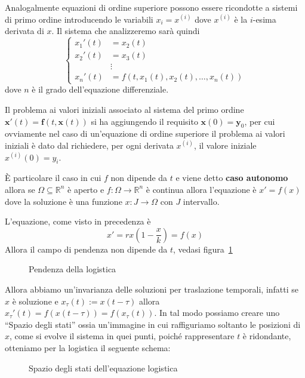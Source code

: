 Analogalmente equazioni di ordine superiore possono essere ricondotte a sistemi
di primo ordine introducendo le variabili \(x_{i} = x^{(i)}\) dove \(x^{(i)}\) è
la \(i\)-esima derivata di \(x\). Il sistema che analizzeremo sarà quindi
\[
    \begin{cases}
        x_{1}'(t) &= x_{2}(t) \\
        x_{2}'(t) &= x_{3}(t) \\
        &\vdots \\
        x_{n}'(t) &= f(t, x_{1}(t), x_{2}(t), \ldots, x_{n}(t))
    \end{cases}
\]
dove \(n\) è il grado dell'equazione differenziale.

Il problema ai valori iniziali associato al sistema del primo ordine
\(\mathbf{x}'(t) = \mathbf{f}(t, \mathbf{x}(t))\) si ha aggiungendo il requisito
\(\mathbf{x}(0) = \mathbf{y}_0\), per cui ovviamente nel caso di un'equazione di
ordine superiore il problema ai valori iniziali è dato dal richiedere, per ogni
derivata \(x^{(i)}\), il valore iniziale \(x^{(i)}(0) = y_{i}\).

È particolare il caso in cui \(f\) non dipende da \(t\) e viene detto
\textbf{caso autonomo} allora se \(\Omega \subseteq \mathbb{R}^{n} \) è aperto e
\(f: \Omega \to \mathbb{R}^{n}\) è continua allora l'equazione è \(x' = f(x)\)
dove la soluzione è una funzione \(x : J \to \Omega\) con \(J\) intervallo.
\begin{example}[Logistica]
    L'equazione, come visto in precedenza è 
    \[
        x' = rx(1- \frac{x}{k}) = f(x)
    \]
    Allora il campo di pendenza non dipende da \(t\), vedasi
    figura~\ref{fig:pendenza_logistica}
\begin{figure}[ht]
    \centering
    \caption{Pendenza della logistica}\label{fig:pendenza_logistica}
\end{figure}

Allora abbiamo un'invarianza delle soluzioni per traslazione temporali, infatti
se \(x\) è soluzione e \(x_\tau(t) := x(t - \tau)\) allora \(x_\tau'(t) =
f(x(t-\tau)) = f(x_\tau(t))\).
In tal modo possiamo creare uno ``Spazio degli stati'' ossia un'immagine in cui
raffiguriamo soltanto le posizioni di \(x\), come si evolve il sistema in quei
punti, poiché rappresentare \(t\) è ridondante, otteniamo per la logistica il
seguente schema:

\begin{figure}[ht]
    \centering
    \caption{Spazio degli stati dell'equazione logistica}\label{fig:logistica_stati}
\end{figure}
\end{example}

